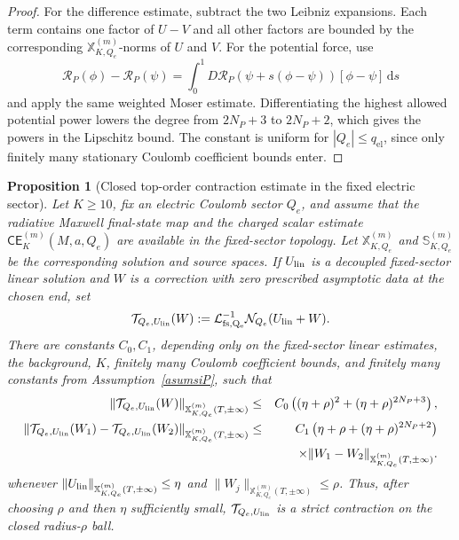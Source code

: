 \documentclass[11pt]{article}
\numberwithin{equation}{section}
\theoremstyle{plain}
\newtheorem{proposition}[theorem]{Proposition}
\theoremstyle{definition}
\theoremstyle{remark}
\newcommand{\dd}{\mathrm{d}}
\newcommand{\CElec}{\mathsf{CE}}
\begin{document}
\begin{proof}
For the difference estimate, subtract the two Leibniz expansions.  Each term contains one factor of \(U-V\) and all other factors are bounded by the corresponding \(\mathbb X^{(m)}_{K,Q_e}\)-norms of \(U\) and \(V\).  For the potential force, use
\begin{equation}
 \mathcal R_P(\phi)-\mathcal R_P(\psi)
 =\int_0^1D\mathcal R_P(\psi+s(\phi-\psi))[\phi-\psi]\,\dd s
\end{equation}
and apply the same weighted Moser estimate.  Differentiating the highest allowed potential power lowers the degree from \(2N_P+3\) to \(2N_P+2\), which gives the powers in the Lipschitz bound.  The constant is uniform for \(|Q_e|\le q_{\mathrm{el}}\), since only finitely many stationary Coulomb coefficient bounds enter.
\end{proof}

\begin{proposition}[Closed top-order contraction estimate in the fixed electric sector]\label{prop:electric-closed-sector-contraction}
Let \(K\ge10\), fix an electric Coulomb sector \(Q_e\), and assume that the radiative Maxwell final-state map and the charged scalar estimate \(\CElec^{(m)}_K(M,a,Q_e)\) are available in the fixed-sector topology.  Let \(\mathbb X^{(m)}_{K,Q_e}\) and \(\mathbb S^{(m)}_{K,Q_e}\) be the corresponding solution and source spaces.  If \(U_{\rm lin}\) is a decoupled fixed-sector linear solution and \(W\) is a correction with zero prescribed asymptotic data at the chosen end, set
\begin{equation}
 \mathcal T_{Q_e,U_{\rm lin}}(W)
 :=\mathcal L^{-1}_{\rm fs,Q_e}\mathcal N_{Q_e}(U_{\rm lin}+W).
\end{equation}
There are constants \(C_0,C_1\), depending only on the fixed-sector linear estimates, the background, \(K\), finitely many Coulomb coefficient bounds, and finitely many constants from Assumption~\ref{asumsiP}, such that
\begin{eqnarray}
 \|\mathcal T_{Q_e,U_{\rm lin}}(W)\|_{\mathbb X^{(m)}_{K,Q_e}(T,\pm\infty)}
 &\le& C_0\left((\eta+\rho)^2+(\eta+\rho)^{2N_P+3}\right),\nonumber\\
 \|\mathcal T_{Q_e,U_{\rm lin}}(W_1)-\mathcal T_{Q_e,U_{\rm lin}}(W_2)\|_{\mathbb X^{(m)}_{K,Q_e}(T,\pm\infty)}
 &\le& C_1\left(\eta+\rho+(\eta+\rho)^{2N_P+2}\right)\nonumber\\
 &&\quad\times
 \|W_1-W_2\|_{\mathbb X^{(m)}_{K,Q_e}(T,\pm\infty)}.
\end{eqnarray}
whenever \(\|U_{\rm lin}\|_{\mathbb X^{(m)}_{K,Q_e}(T,\pm\infty)}\le\eta\) and \(\|W_j\|_{\mathbb X^{(m)}_{K,Q_e}(T,\pm\infty)}\le\rho\).  Thus, after choosing \(\rho\) and then \(\eta\) sufficiently small, \(\mathcal T_{Q_e,U_{\rm lin}}\) is a strict contraction on the closed radius-\(\rho\) ball.
\end{proposition}
\end{document}
